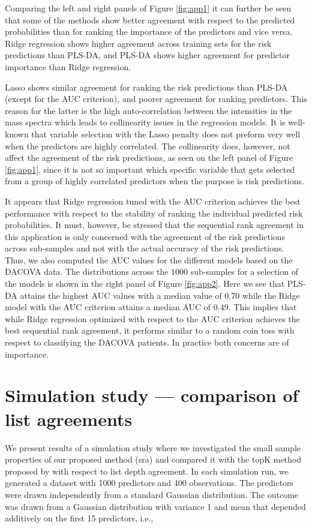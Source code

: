 \documentclass[12pt,a4paper]{article}
\theoremstyle{plain}
\begin{document}
Comparing the left and right panels of Figure \ref{fig:app1} it can
further be seen that some of the methods show better agreement with
respect to the predicted probabilities than for ranking the importance
of the predictors and vice versa. Ridge regression shows higher agreement across training
sets for the risk predictions than PLS-DA, and PLS-DA shows higher
agreement for predictor importance than Ridge regression.

Lasso shows similar agreement for ranking the risk predictions than
PLS-DA (except for the AUC criterion), and poorer agreement for
ranking predictors. This reason for the latter is the high
auto-correlation between the intensities in the mass spectra which
leads to collinearity issues in the regression models. It is
well-known that variable selection with the Lasso penalty does not
preform very well when the predictors are highly correlated. The
collinearity does, however, not affect the agreement of the risk
predictions, as seen on the left panel of Figure \ref{fig:app1}, since
it is not so important which specific variable that gets selected from
a group of highly correlated predictors when the purpose is risk
predictions.

It appears that Ridge regression tuned with the AUC criterion achieves
the best performance with respect to the stability of ranking the
individual predicted risk probabilities. It must, however, be stressed
that the sequential rank agreement in this application is only
concerned with the agreement of the risk predictions across
sub-samples and not with the actual accuracy of the risk
predictions. Thus, we also computed the AUC values for the different models
based on the DACOVA data. The distributions across the $1000$
sub-samples for a selection of the models is shown in the right panel
of Figure \ref{fig:app2}.  Here we see that PLS-DA attains the highest
AUC values with a median value of $0.70$ while the Ridge model with
the AUC criterion attains a median AUC of $0.49$. This implies that
while Ridge regression optimized with respect to the AUC criterion
achieves the best sequential rank agreement, it performs similar to a
random coin toss with respect to classifying the DACOVA patients.
In practice both concerns are of importance.


\section{Simulation study --- comparison of list agreements}

We present results of a simulation study where we investigated the
small sample properties of our proposed method (sra) and compared it
with the topK method proposed by \citet{hall:schi:2012} with respect
to list depth agreement. In each simulation run, we generated a
dataset with 1000 predictors and 400 observations. The predictors were
drawn independently from a standard Gaussian distribution. The outcome
was drawn from a Gaussian distribution with variance 1 and mean that
depended additively on the first 15 predictors, i.e.,
\end{document}
